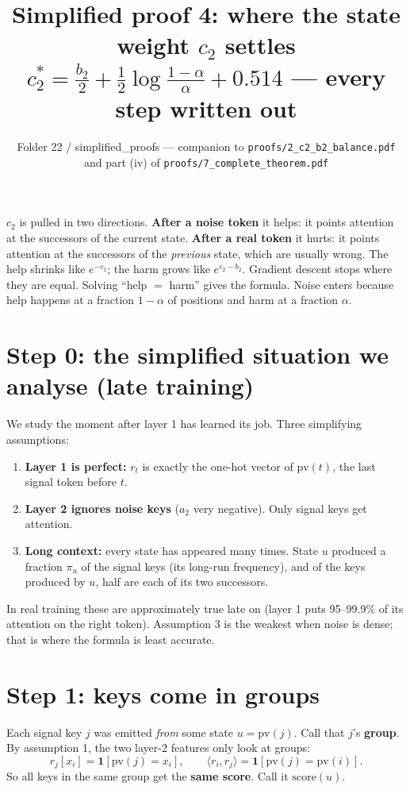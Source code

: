 \documentclass[11pt]{article}
\title{Simplified proof 4: where the state weight $c_2$ settles\\[4pt]
\large $c_2^\ast=\tfrac{b_2}{2}+\tfrac12\log\tfrac{1-\alpha}{\alpha}+0.514$ --- every step written out}
\author{Folder 22 / simplified\_proofs --- companion to \texttt{proofs/2\_c2\_b2\_balance.pdf} and part (iv) of \texttt{proofs/7\_complete\_theorem.pdf}}
\date{}
\newcommand{\1}{\mathbf{1}}
\begin{document}
\maketitle

\begin{idea}
$c_2$ is pulled in two directions. \textbf{After a noise token} it helps: it points attention at the
successors of the current state. \textbf{After a real token} it hurts: it points attention at the
successors of the \emph{previous} state, which are usually wrong. The help shrinks like $e^{-c_2}$; the harm
grows like $e^{c_2-b_2}$. Gradient descent stops where they are equal. Solving ``help $=$ harm'' gives the
formula. Noise enters because help happens at a fraction $1-\alpha$ of positions and harm at a fraction $\alpha$.
\end{idea}

\section{Step 0: the simplified situation we analyse (late training)}
We study the moment after layer 1 has learned its job. Three simplifying assumptions:
\begin{enumerate}
\item \textbf{Layer 1 is perfect:} $r_t$ is exactly the one-hot vector of $\mathrm{pv}(t)$, the last signal token
before $t$.
\item \textbf{Layer 2 ignores noise keys} ($a_2$ very negative). Only signal keys get attention.
\item \textbf{Long context:} every state has appeared many times. State $u$ produced a fraction $\pi_u$ of
the signal keys (its long-run frequency), and of the keys produced by $u$, half are each of its two
successors.
\end{enumerate}
In real training these are approximately true late on (layer 1 puts 95--99.9\% of its attention on the
right token). Assumption 3 is the weakest when noise is dense; that is where the formula is least accurate.

\section{Step 1: keys come in groups}
Each signal key $j$ was emitted \emph{from} some state $u=\mathrm{pv}(j)$. Call that $j$'s \textbf{group}. By
assumption 1, the two layer-2 features only look at groups:
\[
r_j[x_i]=\1[\mathrm{pv}(j)=x_i],\qquad \langle r_i,r_j\rangle=\1[\mathrm{pv}(j)=\mathrm{pv}(i)] .
\]
So all keys in the same group get the \textbf{same score}. Call it $\mathrm{score}(u)$.
\end{document}

